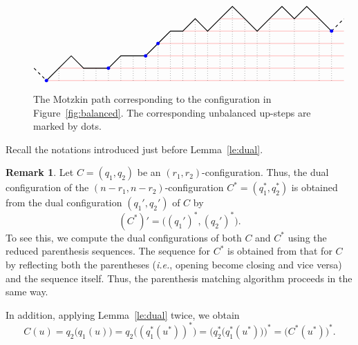\documentclass[reqno]{amsart}
\newcommand{\0}{\phantom{c}}
\newcommand{\set}[1]{\left\{ #1 \right\}}
\newcommand{\tup}[1]{\left( #1 \right)}
\theoremstyle{plain}
\theoremstyle{definition}
\newtheorem{remark}[thm]{Remark}
\numberwithin{equation}{section}
\begin{document}
\begin{figure}[t]
\[
\begin{tikzpicture}[scale=0.45]
\draw[-,thin,red!50] (0,0) -- (24,0);
\draw[-,thin,red!50] (1,1) -- (24,1);
\draw[-,thin,red!50] (8,2) -- (24,2);
\draw[-,thin,red!50] (9,3) -- (24,3);
\draw[-,thin,red!50] (11,4) -- (24,4);
\draw[-,thin,red!50] (14,5) -- (16,5);
\draw[-,thin,red!50] (18,5) -- (22,5);
\draw[-,thick,dashed] (-1,1) -- (0,0);
\draw[-,dotted] (1,0) -- (1,1);
\draw[-,dotted] (3,0) -- (3,1);
\draw[-,dotted] (4,0) -- (4,1);
\draw[-,dotted] (5,0) -- (5,1);
\draw[-,dotted] (6,0) -- (6,2);
\draw[-,dotted] (7,0) -- (7,2);
\draw[-,dotted] (8,0) -- (8,2);
\draw[-,dotted] (9,0) -- (9,3);
\draw[-,dotted] (10,0) -- (10,4);
\draw[-,dotted] (11,0) -- (11,4);
\draw[-,dotted] (12,0) -- (12,5);
\draw[-,dotted] (13,0) -- (13,4);
\draw[-,dotted] (14,0) -- (14,5);
\draw[-,dotted] (15,0) -- (15,6);
\draw[-,dotted] (16,0) -- (16,5);
\draw[-,dotted] (17,0) -- (17,4);
\draw[-,dotted] (18,0) -- (18,5);
\draw[-,dotted] (20,0) -- (20,5);
\draw[-,dotted] (22,0) -- (22,5);
\draw[-,dotted] (23,0) -- (23,4);
\draw[-,thick] (0,0) -- (1,1) -- (2,2) -- (3,1) -- (4,1) -- (5,1) -- (6,2) -- (7,2) -- (8,2) -- (9,3) -- (10,4) -- (11,4) -- (12,5) -- (13,4) -- (14,5) -- (15,6) -- (16,5) -- (17,4) -- (18,5) -- (19,6) -- (20,5) -- (21,6) -- (22,5) -- (23,4);
\draw[-,thick,dashed] (23,4) -- (24,5);
\fill[blue] (0,0) circle (4pt);
\fill[blue] (5,1) circle (4pt);
\fill[blue] (8,2) circle (4pt);
\fill[blue] (9,3) circle (4pt);
\fill[blue] (23,4) circle (4pt);
\end{tikzpicture}
\]
\caption{The Motzkin path corresponding to the configuration in Figure~\ref{fig:balanced}.
The corresponding unbalanced up-steps are marked by dots.}
\label{fig:balanced_motzkin}
\end{figure}

Recall the notations introduced just before Lemma~\ref{le:dual}.

\begin{remark}
\label{rmk:balanced-dual-let}
Let $C = (q_1, q_2)$ be an $(r_1, r_2)$-configuration.
Thus, the dual configuration of the $(n-r_1, n-r_2)$-configuration $C^* = \tup{q_1^*, q_2^*}$ is obtained from the dual configuration $\tup{q_1', q_2'}$ of $C$ by
\begin{equation}
 (C^*)' = \bigl( (q_1')^*, (q_2')^* \bigr) .
 \label{eq.rmk:balanced-dual-let.dual}
\end{equation}
To see this, we compute the dual configurations of both $C$ and $C^*$ using the reduced parenthesis sequences. The sequence for $C^*$ is obtained from that for $C$ by reflecting both the parentheses (\textit{i.e.}, opening become closing and vice versa) and the sequence itself. Thus, the parenthesis matching algorithm proceeds in the same way.

In addition, applying Lemma~\ref{le:dual} twice, we obtain
\[
C(u) = q_2\bigl( q_1(u) \bigr) = q_2\bigl( (q^*_1(u^*))^* \bigr) = \bigl( q_2^*\bigl( q_1^*(u^*) \bigr) \bigr)^* = \bigl( C^*(u^*) \bigr)^* .
\]
\end{remark}
\end{document}
